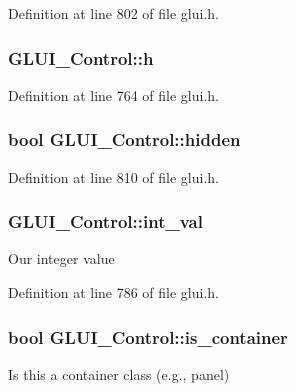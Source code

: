 Definition at line 802 of file glui.\+h.

\hypertarget{class_g_l_u_i___control_a058c4f060b70952e6199f1409710ba0b}{
\subsubsection[{h}]{ G\+L\+U\+I\+\_\+\+Control\+::h}}\label{class_g_l_u_i___control_a058c4f060b70952e6199f1409710ba0b}


Definition at line 764 of file glui.\+h.

\hypertarget{class_g_l_u_i___control_aec1b041f28d8ee36a0241dde827fea21}{
\subsubsection[{hidden}]{\setlength{\rightskip}{0pt plus 5cm}bool G\+L\+U\+I\+\_\+\+Control\+::hidden}}\label{class_g_l_u_i___control_aec1b041f28d8ee36a0241dde827fea21}


Definition at line 810 of file glui.\+h.

\hypertarget{class_g_l_u_i___control_a4a890b5b5a854b34200b5e63f1069b4e}{
\subsubsection[{int\+\_\+val}]{ G\+L\+U\+I\+\_\+\+Control\+::int\+\_\+val}}\label{class_g_l_u_i___control_a4a890b5b5a854b34200b5e63f1069b4e}
Our integer value 

Definition at line 786 of file glui.\+h.

\hypertarget{class_g_l_u_i___control_ac667bec4efbc9bdbf3e246b4471fb4cb}{
\subsubsection[{is\+\_\+container}]{\setlength{\rightskip}{0pt plus 5cm}bool G\+L\+U\+I\+\_\+\+Control\+::is\+\_\+container}}\label{class_g_l_u_i___control_ac667bec4efbc9bdbf3e246b4471fb4cb}
Is this a container class (e.\+g., panel) 

